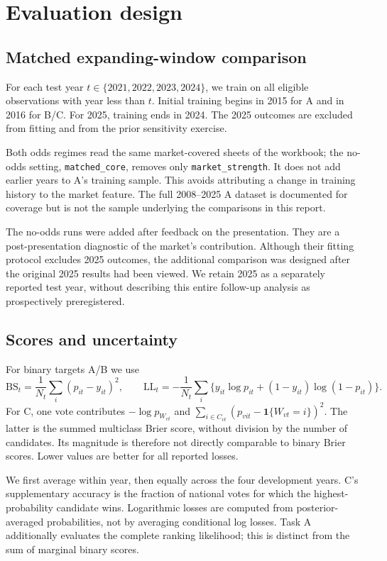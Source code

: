 \documentclass[11pt,a4paper]{article}
\begin{document}
\section{Evaluation design}
\subsection{Matched expanding-window comparison}
For each test year $t\in\{2021,2022,2023,2024\}$, we train on all eligible observations with year less than $t$. Initial training begins in 2015 for A and in 2016 for B/C. For 2025, training ends in 2024. The 2025 outcomes are excluded from fitting and from the prior sensitivity exercise.

Both odds regimes read the same market-covered sheets of the workbook; the no-odds setting, \texttt{matched\_core}, removes only \texttt{market\_strength}. It does not add earlier years to A's training sample. This avoids attributing a change in training history to the market feature. The full 2008--2025 A dataset is documented for coverage but is not the sample underlying the comparisons in this report.

The no-odds runs were added after feedback on the presentation. They are a post-presentation diagnostic of the market's contribution. Although their fitting protocol excludes 2025 outcomes, the additional comparison was designed after the original 2025 results had been viewed. We retain 2025 as a separately reported test year, without describing this entire follow-up analysis as prospectively preregistered.

\subsection{Scores and uncertainty}
For binary targets A/B we use
\begin{equation}
 \mathrm{BS}_t=\frac{1}{N_t}\sum_i(p_{it}-y_{it})^2,\qquad
 \mathrm{LL}_t=-\frac{1}{N_t}\sum_i
 \{y_{it}\log p_{it}+(1-y_{it})\log(1-p_{it})\}.
\end{equation}
For C, one vote contributes $-\log p_{W_{vt}}$ and
$\sum_{i\in C_{vt}}(p_{vit}-\mathbf1\{W_{vt}=i\})^2$. The latter is the summed multiclass Brier score, without division by the number of candidates. Its magnitude is therefore not directly comparable to binary Brier scores. Lower values are better for all reported losses.

We first average within year, then equally across the four development years. C's supplementary accuracy is the fraction of national votes for which the highest-probability candidate wins. Logarithmic losses are computed from posterior-averaged probabilities, not by averaging conditional log losses. Task A additionally evaluates the complete ranking likelihood; this is distinct from the sum of marginal binary scores.
\end{document}
